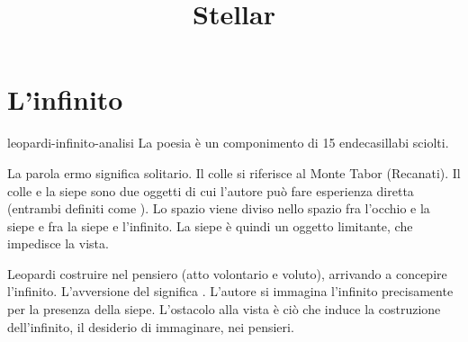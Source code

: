 \documentclass[preview]{standalone}
\begin{document}
\title{Stellar}
\genpage

\section{L'infinito}


\begin{snippet}{leopardi-infinito-analisi}
    La poesia è un componimento di 15 endecasillabi sciolti. 


    La parola ermo significa solitario.
    Il colle si riferisce al Monte Tabor (Recanati).
    Il colle e la siepe sono due oggetti di cui l'autore può fare esperienza diretta
    (entrambi definiti come ).
    Lo spazio viene diviso nello spazio fra l'occhio e la siepe
    e fra la siepe e l'infinito.
    La siepe è quindi un oggetto limitante, che impedisce la vista.

    Leopardi costruire nel pensiero (atto volontario e voluto),
    arrivando a concepire l'infinito.
    L'avversione del  significa .
    L'autore si immagina l'infinito precisamente per la presenza della siepe.
    L'ostacolo alla vista è ciò che induce la costruzione dell'infinito, il desiderio
    di immaginare, nei pensieri.


\end{snippet}
\end{document}
